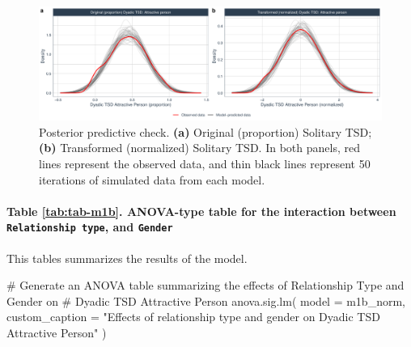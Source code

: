 \documentclass[
  bookmarksnumbered]{article}
\newenvironment{Shaded}{\begin{snugshade}}{\end{snugshade}}
\newcommand{\AttributeTok}[1]{\textcolor[rgb]{0.80,0.80,0.80}{#1}}
\newcommand{\CommentTok}[1]{\textcolor[rgb]{0.50,0.62,0.50}{#1}}
\newcommand{\FunctionTok}[1]{\textcolor[rgb]{0.94,0.94,0.56}{#1}}
\newcommand{\NormalTok}[1]{\textcolor[rgb]{0.80,0.80,0.80}{#1}}
\newcommand{\StringTok}[1]{\textcolor[rgb]{0.80,0.58,0.58}{#1}}
\begin{document}
\begin{figure}
\centering
\includegraphics{Sexual_Desire_Arousal_anonymous_files/figure-latex/ppc-m1b-1.pdf}
\caption{\label{fig:ppc-m1b}Posterior predictive check. \textbf{(a)} Original (proportion) Solitary TSD; \textbf{(b)} Transformed (normalized) Solitary TSD. In both panels, red lines represent the observed data, and thin black lines represent 50 iterations of simulated data from each model.}
\end{figure}

\paragraph{\texorpdfstring{Table \ref{tab:tab-m1b}. ANOVA-type table for the interaction between \texttt{Relationship\ type}, and \texttt{Gender}}{Table \ref{tab:tab-m1b}. ANOVA-type table for the interaction between Relationship type, and Gender}}\label{table-reftabtab-m1b.-anova-type-table-for-the-interaction-between-relationship-type-and-gender}

This tables summarizes the results of the model.

\begin{Shaded}
\begin{Highlighting}[]
\CommentTok{\# Generate an ANOVA table summarizing the effects of Relationship Type and Gender on}
\CommentTok{\# Dyadic TSD Attractive Person}
\FunctionTok{anova.sig.lm}\NormalTok{(}
  \AttributeTok{model =}\NormalTok{ m1b\_norm,}
  \AttributeTok{custom\_caption =} \StringTok{"Effects of relationship type and gender on Dyadic TSD Attractive Person"}
\NormalTok{)}
\end{Highlighting}
\end{Shaded}
\end{document}
